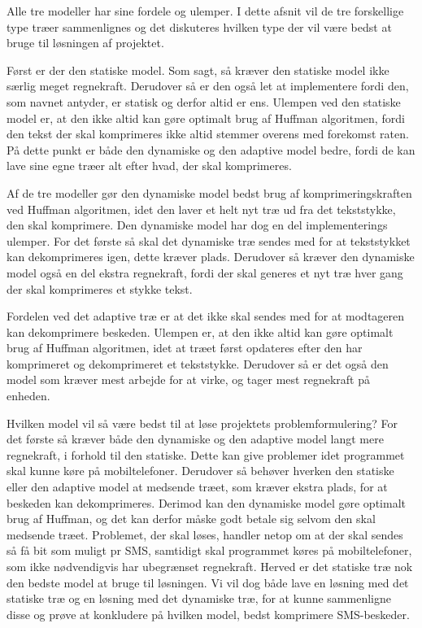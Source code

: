Alle tre modeller har sine fordele og ulemper. I dette afsnit vil de tre forskellige type træer sammenlignes og det diskuteres hvilken type der vil være bedst at bruge til løsningen af projektet.

Først er der den statiske model. Som sagt, så kræver den statiske model ikke særlig meget regnekraft. Derudover så er den også let at implementere fordi den, som navnet antyder, er statisk og derfor altid er ens. Ulempen ved den statiske model er, at den ikke altid kan gøre optimalt brug af Huffman algoritmen, fordi den tekst der skal komprimeres ikke altid stemmer overens med forekomst raten. På dette punkt er både den dynamiske og den adaptive model bedre, fordi de kan lave sine egne træer alt efter hvad, der skal komprimeres.

Af de tre modeller gør den dynamiske model bedst brug af komprimeringskraften ved Huffman algoritmen, idet den laver et helt nyt træ ud fra det tekststykke, den skal komprimere. Den dynamiske model har dog en del implementerings ulemper. For det første så skal det dynamiske træ sendes med for at tekststykket kan dekomprimeres igen, dette kræver plads. Derudover så kræver den dynamiske model også en del ekstra regnekraft, fordi der skal generes et nyt træ hver gang der skal komprimeres et stykke tekst.

Fordelen ved det adaptive træ er at det ikke skal sendes med for at modtageren kan dekomprimere beskeden. Ulempen er, at den ikke altid kan gøre optimalt brug af Huffman algoritmen, idet at træet først opdateres efter den har komprimeret og dekomprimeret et tekststykke. Derudover så er det også den model som kræver mest arbejde for at virke, og tager mest regnekraft på enheden.

Hvilken model vil så være bedst til at løse projektets problemformulering? For det første så kræver både den dynamiske og den adaptive model langt mere regnekraft, i forhold til den statiske. Dette kan give problemer idet programmet skal kunne køre på mobiltelefoner. Derudover så behøver hverken den statiske eller den adaptive model at medsende træet, som kræver ekstra plads, for at beskeden kan dekomprimeres. Derimod kan den dynamiske model gøre optimalt brug af Huffman, og det kan derfor måske godt betale sig selvom den skal medsende træet. Problemet, der skal løses, handler netop om at der skal sendes så få bit som muligt pr SMS, samtidigt skal programmet køres på mobiltelefoner, som ikke nødvendigvis har ubegrænset regnekraft. Herved er det statiske træ nok den bedste model at bruge til løsningen. Vi vil dog både lave en løsning med det statiske træ og en løsning med det dynamiske træ, for at kunne sammenligne disse og prøve at konkludere på hvilken model, bedst komprimere SMS-beskeder.